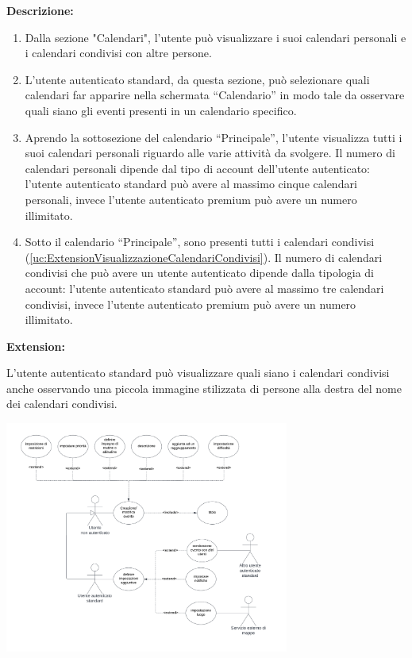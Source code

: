 \begin{listaPersonale}[UC]{}
    \textbf{Descrizione:}
    \begin{enumerate}
        \item Dalla sezione "Calendari", l'utente può visualizzare i suoi calendari personali e i calendari condivisi con altre persone.
        \item L'utente autenticato standard, da questa sezione, può selezionare quali calendari far apparire nella schermata “Calendario” in modo tale da osservare quali siano gli eventi presenti in un calendario specifico.
        \item Aprendo la sottosezione del calendario “Principale”, l'utente visualizza tutti i suoi calendari personali riguardo alle varie attività da svolgere. Il numero di calendari personali dipende dal tipo di account dell'utente autenticato: l'utente autenticato standard può avere al massimo cinque calendari personali, invece l'utente autenticato premium può avere un numero illimitato.
        \item Sotto il calendario “Principale”, sono presenti tutti i calendari condivisi (\ref{uc:ExtensionVisualizzazioneCalendariCondivisi}). Il numero di calendari condivisi che può avere un utente autenticato dipende dalla tipologia di account: l'utente autenticato standard può avere al massimo tre calendari condivisi, invece l'utente autenticato premium può avere un numero illimitato.
    \end{enumerate}


    \textbf{Extension:}
    \begin{enumerate}[label=\textbf{[extension \arabic{enumii}]}, ref= \textbf{[extension \arabic{enumii}]}]
         L'utente autenticato standard può visualizzare quali siano i calendari condivisi anche osservando una piccola immagine stilizzata di persone alla destra del nome dei calendari condivisi.
    \end{enumerate}





    \newpage

    \begin{center}
        \includegraphics[width=0.7\textwidth]{img/Diagrammi/UseCases/CreazioneModificaEvento.png}
    \end{center}



\end{listaPersonale}
